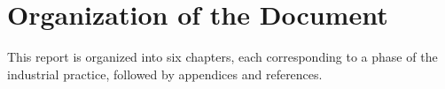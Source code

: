 ﻿\documentclass[12pt, a4paper]{article}
\begin{document}
\listoftables
{}
\newpage

\listoffigures
{}
\newpage

\section*{Organization of the Document}

This report is organized into six chapters, each corresponding to a phase of the industrial practice, followed by appendices and references.
\end{document}

